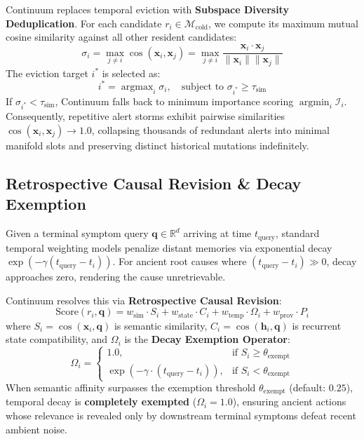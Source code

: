 \documentclass[10pt,journal,compsoc]{IEEEtran}
\begin{document}
Continuum replaces temporal eviction with \textbf{Subspace Diversity Deduplication}. For each candidate $r_i \in \mathcal{M}_{\text{cold}}$, we compute its maximum mutual cosine similarity against all other resident candidates:
\begin{equation}
\sigma_i = \max_{j \ne i} \cos(\mathbf{x}_i, \mathbf{x}_j) = \max_{j \ne i} \frac{\mathbf{x}_i \cdot \mathbf{x}_j}{\|\mathbf{x}_i\| \|\mathbf{x}_j\|}
\end{equation}
The eviction target $i^*$ is selected as:
\begin{equation}
i^* = \operatorname{argmax}_{i} \sigma_i, \quad \text{subject to } \sigma_{i^*} \ge \tau_{\text{sim}}
\end{equation}
If $\sigma_{i^*} < \tau_{\text{sim}}$, Continuum falls back to minimum importance scoring $\operatorname{argmin}_i \mathcal{I}_i$. Consequently, repetitive alert storms exhibit pairwise similarities $\cos(\mathbf{x}_i, \mathbf{x}_j) \to 1.0$, collapsing thousands of redundant alerts into minimal manifold slots and preserving distinct historical mutations indefinitely.

\subsection{Retrospective Causal Revision \& Decay Exemption}
Given a terminal symptom query $\mathbf{q} \in \mathbb{R}^d$ arriving at time $t_{\text{query}}$, standard temporal weighting models penalize distant memories via exponential decay $\exp(-\gamma (t_{\text{query}} - t_i))$. For ancient root causes where $(t_{\text{query}} - t_i) \gg 0$, decay approaches zero, rendering the cause unretrievable.

Continuum resolves this via \textbf{Retrospective Causal Revision}:
\begin{equation}
\text{Score}(r_i, \mathbf{q}) = w_{\text{sim}} \cdot S_i + w_{\text{state}} \cdot C_i + w_{\text{temp}} \cdot \Omega_i + w_{\text{prov}} \cdot P_i
\end{equation}
where $S_i = \cos(\mathbf{x}_i, \mathbf{q})$ is semantic similarity, $C_i = \cos(\mathbf{h}_i, \mathbf{q})$ is recurrent state compatibility, and $\Omega_i$ is the \textbf{Decay Exemption Operator}:
\begin{equation}
\Omega_i = \begin{cases}
1.0, & \text{if } S_i \ge \theta_{\text{exempt}} \\
\exp\left(-\gamma \cdot (t_{\text{query}} - t_i)\right), & \text{if } S_i < \theta_{\text{exempt}}
\end{cases}
\end{equation}
When semantic affinity surpasses the exemption threshold $\theta_{\text{exempt}}$ (default: $0.25$), temporal decay is \textbf{completely exempted} ($\Omega_i = 1.0$), ensuring ancient actions whose relevance is revealed only by downstream terminal symptoms defeat recent ambient noise.
\end{document}
